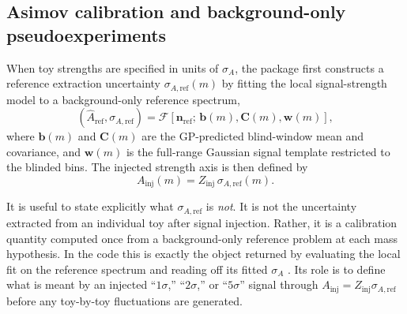 \FloatBarrier



\FloatBarrier

\subsection{Asimov calibration and background-only pseudoexperiments}

When toy strengths are specified in units of $\sigma_A$, the package first constructs a
reference extraction uncertainty $\sigma_{A,\mathrm{ref}}(m)$ by fitting the local
signal-strength model to a background-only reference spectrum,
\begin{equation}
\left(\hat A_{\mathrm{ref}},\sigma_{A,\mathrm{ref}}\right)
=
\mathcal{F}\!\left[\bm{n}_{\mathrm{ref}};\,\bm{b}(m),\bm{C}(m),\bm{w}(m)\right],
\end{equation}
where $\bm{b}(m)$ and $\bm{C}(m)$ are the GP-predicted blind-window mean and covariance,
and $\bm{w}(m)$ is the full-range Gaussian signal template restricted to the blinded
bins. The injected strength axis is then defined by
\begin{equation}
A_{\mathrm{inj}}(m) = Z_{\mathrm{inj}}\,\sigma_{A,\mathrm{ref}}(m).
\end{equation}

It is useful to state explicitly what $\sigma_{A,\mathrm{ref}}$ is \emph{not}. It is
not the uncertainty extracted from an individual toy after signal injection. Rather, it
is a calibration quantity computed once from a background-only reference problem at each
mass hypothesis. In the code this is exactly the object returned by evaluating the local
fit on the reference spectrum and reading off its fitted $\sigma_A$
\cite{Cowan1998,Cowan2011}. Its role is to define what is meant by an injected
``$1\sigma$,'' ``$2\sigma$,'' or ``$5\sigma$'' signal through
$A_{\mathrm{inj}}=Z_{\mathrm{inj}}\sigma_{A,\mathrm{ref}}$ before any toy-by-toy
fluctuations are generated.

